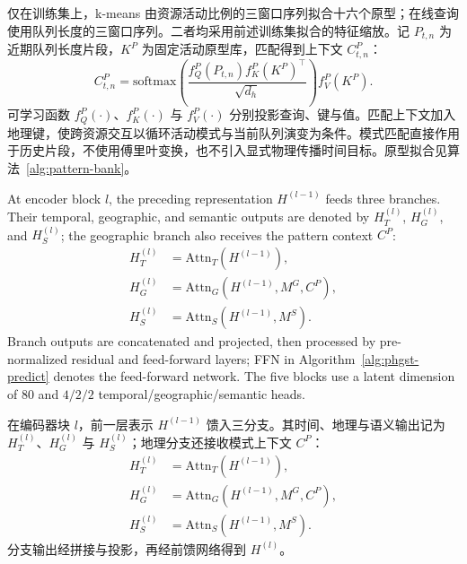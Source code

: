 \documentclass[a4paper,fleqn]{cas-dc}
\newcommand{\zhpara}[1]{%
  \par\begingroup\small\color{black!72}\noindent #1\par\endgroup}
\begin{document}
\zhpara{仅在训练集上，k-means 由资源活动比例的三窗口序列拟合十六个原型；在线查询使用队列长度的三窗口序列。二者均采用前述训练集拟合的特征缩放。记 $P_{t,n}$ 为近期队列长度片段，$K^P$ 为固定活动原型库，匹配得到上下文 $C^P_{t,n}$：
\begin{equation}
C^P_{t,n}=
\mathrm{softmax}\!\left(
\frac{f_Q^P(P_{t,n})f_K^P(K^P)^\top}{\sqrt{d_h}}
\right)f_V^P(K^P).
\end{equation}
可学习函数 $f_Q^P(\cdot)$、$f_K^P(\cdot)$ 与 $f_V^P(\cdot)$ 分别投影查询、键与值。匹配上下文加入地理键，使跨资源交互以循环活动模式与当前队列演变为条件。模式匹配直接作用于历史片段，不使用傅里叶变换，也不引入显式物理传播时间目标。原型拟合见算法~\ref{alg:pattern-bank}。}


At encoder block $l$, the preceding representation $H^{(l-1)}$ feeds three branches. Their temporal, geographic, and semantic outputs are denoted by $H_T^{(l)}$, $H_G^{(l)}$, and $H_S^{(l)}$; the geographic branch also receives the pattern context $C^P$:
\begin{equation}
\begin{aligned}
H_T^{(l)}&=\mathrm{Attn}_T(H^{(l-1)}),\\
H_G^{(l)}&=\mathrm{Attn}_G(H^{(l-1)},M^G,C^P),\\
H_S^{(l)}&=\mathrm{Attn}_S(H^{(l-1)},M^S).
\end{aligned}
\end{equation}
Branch outputs are concatenated and projected, then processed by pre-normalized residual and feed-forward layers; FFN in Algorithm~\ref{alg:phgst-predict} denotes the feed-forward network. The five blocks use a latent dimension of 80 and $4/2/2$ temporal/geographic/semantic heads.

\zhpara{在编码器块 $l$，前一层表示 $H^{(l-1)}$ 馈入三分支。其时间、地理与语义输出记为 $H_T^{(l)}$、$H_G^{(l)}$ 与 $H_S^{(l)}$；地理分支还接收模式上下文 $C^P$：
\begin{equation}
\begin{aligned}
H_T^{(l)}&=\mathrm{Attn}_T(H^{(l-1)}),\\
H_G^{(l)}&=\mathrm{Attn}_G(H^{(l-1)},M^G,C^P),\\
H_S^{(l)}&=\mathrm{Attn}_S(H^{(l-1)},M^S).
\end{aligned}
\end{equation}
分支输出经拼接与投影，再经前馈网络得到 $H^{(l)}$。}
\end{document}

